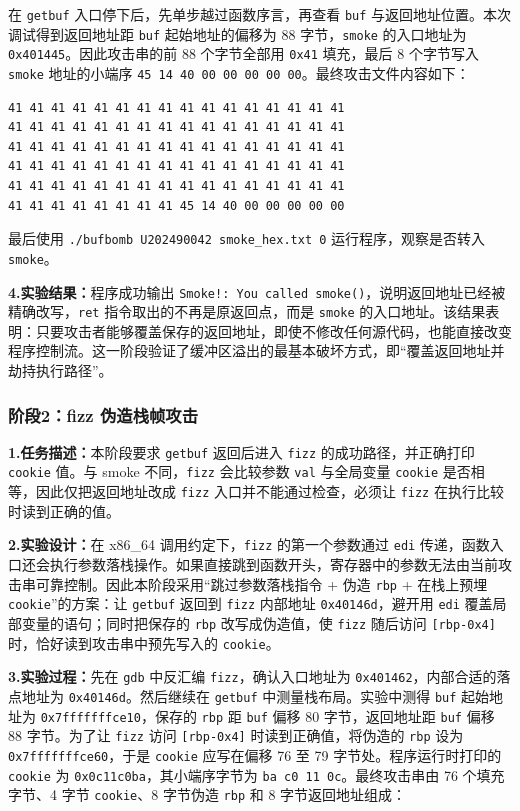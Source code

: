 \documentclass[supercite]{Experimental_Report}
\theoremstyle{definition}
\begin{document}
在 \texttt{getbuf} 入口停下后，先单步越过函数序言，再查看 \texttt{buf} 与返回地址位置。本次调试得到返回地址距 \texttt{buf} 起始地址的偏移为 88 字节，\texttt{smoke} 的入口地址为 \texttt{0x401445}。因此攻击串的前 88 个字节全部用 \texttt{0x41} 填充，最后 8 个字节写入 \texttt{smoke} 地址的小端序 \texttt{45 14 40 00 00 00 00 00}。最终攻击文件内容如下：

\begin{lstlisting}[language={}, caption={阶段1最终攻击串 smoke\_hex.txt}, label={lst:lab4-smoke-payload}]
41 41 41 41 41 41 41 41 41 41 41 41 41 41 41 41
41 41 41 41 41 41 41 41 41 41 41 41 41 41 41 41
41 41 41 41 41 41 41 41 41 41 41 41 41 41 41 41
41 41 41 41 41 41 41 41 41 41 41 41 41 41 41 41
41 41 41 41 41 41 41 41 41 41 41 41 41 41 41 41
41 41 41 41 41 41 41 41 45 14 40 00 00 00 00 00
\end{lstlisting}

最后使用 \texttt{./bufbomb U202490042 smoke\_hex.txt 0} 运行程序，观察是否转入 \texttt{smoke}。

\noindent\textbf{4.实验结果：}程序成功输出 \texttt{Smoke!: You called smoke()}，说明返回地址已经被精确改写，\texttt{ret} 指令取出的不再是原返回点，而是 \texttt{smoke} 的入口地址。该结果表明：只要攻击者能够覆盖保存的返回地址，即使不修改任何源代码，也能直接改变程序控制流。这一阶段验证了缓冲区溢出的最基本破坏方式，即“覆盖返回地址并劫持执行路径”。

\subsubsection{阶段2：fizz 伪造栈帧攻击}
\noindent\textbf{1.任务描述：}本阶段要求 \texttt{getbuf} 返回后进入 \texttt{fizz} 的成功路径，并正确打印 \texttt{cookie} 值。与 smoke 不同，\texttt{fizz} 会比较参数 \texttt{val} 与全局变量 \texttt{cookie} 是否相等，因此仅把返回地址改成 \texttt{fizz} 入口并不能通过检查，必须让 \texttt{fizz} 在执行比较时读到正确的值。

\noindent\textbf{2.实验设计：}在 x86\_64 调用约定下，\texttt{fizz} 的第一个参数通过 \texttt{edi} 传递，函数入口还会执行参数落栈操作。如果直接跳到函数开头，寄存器中的参数无法由当前攻击串可靠控制。因此本阶段采用“跳过参数落栈指令 + 伪造 \texttt{rbp} + 在栈上预埋 \texttt{cookie}”的方案：让 \texttt{getbuf} 返回到 \texttt{fizz} 内部地址 \texttt{0x40146d}，避开用 \texttt{edi} 覆盖局部变量的语句；同时把保存的 \texttt{rbp} 改写成伪造值，使 \texttt{fizz} 随后访问 \texttt{[rbp-0x4]} 时，恰好读到攻击串中预先写入的 \texttt{cookie}。

\noindent\textbf{3.实验过程：}先在 \texttt{gdb} 中反汇编 \texttt{fizz}，确认入口地址为 \texttt{0x401462}，内部合适的落点地址为 \texttt{0x40146d}。然后继续在 \texttt{getbuf} 中测量栈布局。实验中测得 \texttt{buf} 起始地址为 \texttt{0x7fffffffce10}，保存的 \texttt{rbp} 距 \texttt{buf} 偏移 80 字节，返回地址距 \texttt{buf} 偏移 88 字节。为了让 \texttt{fizz} 访问 \texttt{[rbp-0x4]} 时读到正确值，将伪造的 \texttt{rbp} 设为 \texttt{0x7fffffffce60}，于是 \texttt{cookie} 应写在偏移 76 至 79 字节处。程序运行时打印的 \texttt{cookie} 为 \texttt{0x0c11c0ba}，其小端序字节为 \texttt{ba c0 11 0c}。最终攻击串由 76 个填充字节、4 字节 \texttt{cookie}、8 字节伪造 \texttt{rbp} 和 8 字节返回地址组成：
\end{document}
